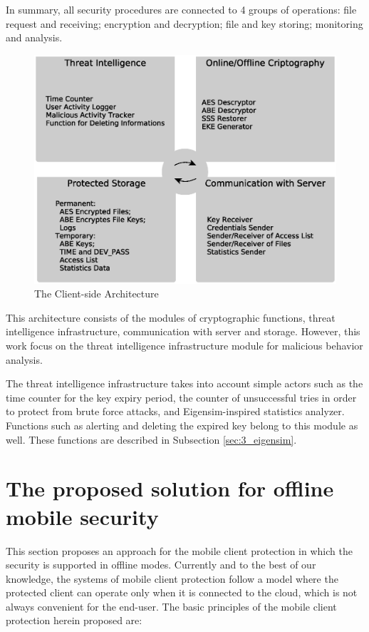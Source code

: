 In summary, all security procedures are connected to 4 groups of operations: file request and receiving; encryption and decryption; file and key storing; monitoring and analysis.

\begin{figure}[h!]
	\centering
	\includegraphics[width=12cm]{figures/ch3/fig02.eps}
	\caption{The Client-side Architecture}
	\label{fig:3_02}
\end{figure}

This architecture consists of the modules of cryptographic functions, threat intelligence infrastructure, communication with server and storage. However, this work focus on the threat intelligence infrastructure module for malicious behavior analysis.

The threat intelligence infrastructure takes into account simple actors such as the time counter for the key expiry period, the counter of unsuccessful tries in order to protect from brute force attacks, and Eigensim-inspired statistics analyzer. Functions such as alerting and deleting the expired key belong to this module as well. These functions are described in Subsection \ref{sec:3_eigensim}.

\section{The proposed solution for offline mobile security}
\label{sec:3_offline_mode}

This section proposes an approach for the mobile client protection in which the security is supported in offline modes. Currently and to the best of our knowledge, the systems of mobile client protection follow a model where the protected client can operate only when it is connected to the cloud, which is not always convenient for the end-user. The basic principles of the mobile client protection herein proposed are: 

